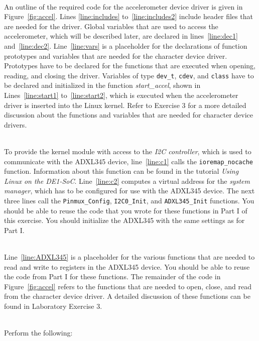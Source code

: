 \documentclass[epsfig,10pt,fullpage]{article}
\begin{document}
~\\
\noindent
An outline of the required code for the accelerometer device driver is given in 
Figure~\ref{fig:accel}. Lines \ref{line:includes} to~\ref{line:includes2} include header files
that are needed for the driver. Global variables that are used to access the accelerometer,
which will be described later, are declared in lines~\ref{line:dec1} and~\ref{line:dec2}.
Line~\ref{line:vars} is a placeholder for the declarations of function prototypes and variables
that are needed for the character device driver. Prototypes have to be declared for the functions
that are executed when opening, reading, and closing the driver. Variables of type 
\texttt{dev\_t}, \texttt{cdev}, and \texttt{class} have to be declared and initialized in
the function {\it start\_accel}, shown in Lines~\ref{line:start1} to~\ref{line:start2},
which is executed when the accelerometer driver is inserted into the Linux kernel. Refer to
Exercise 3 for a more detailed discussion about the functions and variables that are needed for
character device drivers.

~\\
\noindent
To provide the kernel module with access to the {\it I2C controller}, which is used to
communicate with the ADXL345 device, line~\ref{line:c1} calls the \texttt{ioremap\_nocache}
function. Information about this function can be found in the tutorial {\it Using Linux on
the DE1-SoC}. Line~\ref{line:c2} computes a virtual address for the {\it system manager}, 
which has to be configured for use with the ADXL345 device. The next three lines call the
\texttt{Pinmux\_Config}, \texttt{I2C0\_Init}, and \texttt{ADXL345\_Init} functions. You
should be able to reuse the code that you wrote for these functions in Part I of this exercise.
You should initialize the ADXL345 with the same settings as for Part I.

~\\
Line~\ref{line:ADXL345} is a placeholder for the various functions that are needed to read
and write to registers in the ADXL345 device. You should be able to reuse the code from 
Part I for these functions. The remainder of the code in Figure~\ref{fig:accel}
refers to the functions that are needed to open, close, and read from the character device driver.
A detailed discussion of these functions can be found in Laboratory Exercise 3.

~\\
\noindent
Perform the following:
\end{document}

